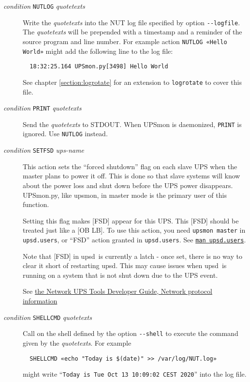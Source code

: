 \documentclass[12pt]{article}
\newcommand{\upsd}{\mbox{\textcolor{UPSDCOLOUR}{upsd}}}
\newcommand{\upsmon}{\mbox{\textcolor{MONCOLOUR}{upsmon}}}
\newcommand{\UPSmon}{\mbox{\textcolor{UPSMONCOLOUR}{UPSmon.py}}}
\newcommand{\status}[1]{\textcolor{UPSDCOLOUR}{[{#1}]}}
\newcommand{\upsdusers}{\textcolor{UPSDCOLOUR}{\texttt{upsd.users}}}
\newcommand{\NUTman}[1]{\href{http://networkupstools.org/docs/man/#1.html}{\texttt{man #1}}}
\begin{document}
\begin{description}
\begin{description}
\item[\textit{condition} \texttt{NUTLOG} \textit{quotetexts}] \hspace{7mm}
  Write the \textit{quotetexts} into the NUT log file specified by option
  \texttt{-\/-logfile}.  The \textit{quotetexts} will be prepended with a
  timestamp and a reminder of the source program and line number.  For example
  action \texttt{NUTLOG «Hello World»} might add the following line to the log
  file:
  \begin{verbatim}
  18:32:25.164 UPSmon.py[3498] Hello World\end{verbatim}
  See chapter \ref{section:logrotate} for an extension to \texttt{logrotate}
  to cover this file.

\item[\textit{condition} \texttt{PRINT} \textit{quotetexts}] \hspace{7mm}
  Send the \textit{quotetexts} to STDOUT.  When UPSmon is daemonized,
  \texttt{PRINT} is ignored.  Use \texttt{NUTLOG} instead.

\item[\textit{condition} \texttt{SETFSD} \textit{ups-name}] \hspace{7mm}
This action sets the ``forced shutdown'' flag on each slave UPS when the
master plans to power it off. This is done so that slave systems will know
about the power loss and shut down before the UPS power disappears.  \UPSmon,
like \upsmon, in master mode is the primary user of this function.

Setting this flag makes \status{FSD} appear for this UPS.  This \status{FSD}
should be treated just like a \status{OB LB}.  To use this action, you need
\texttt{upsmon master} in \upsdusers, or ``FSD'' action granted in \upsdusers.
See \NUTman{upsd.users}. 

Note that \status{FSD} in \upsd\ is currently a latch - once set, there is no
way to clear it short of restarting \upsd.  This may cause issues when
\upsd\ is running on a system that is not shut down due to the UPS event.

See \href{https://networkupstools.org/docs/developer-guide.chunked/ar01s09.html}%
         {the Network UPS Tools Developer Guide, Network protocol information}

\item[\textit{condition} \texttt{SHELLCMD} \textit{quotetexts}] \hspace{7mm}
  Call on the shell defined by the option \texttt{-\/-shell} to execute the
  command given by the \textit{quotetexts}.  For example
  \begin{verbatim}
  SHELLCMD «echo "Today is $(date)" >> /var/log/NUT.log»\end{verbatim}
  might write ``\texttt{Today is Tue Oct 13 10:09:02 CEST 2020}'' into the log file.


\end{description}
\end{description}
\end{document}
